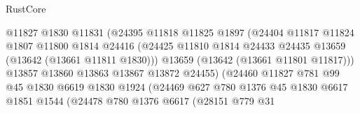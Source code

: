 \begin{lexlean}{RustCore}
\begin{coremodule}
                                      @11827
                                      @1830
                                      @11831
                                      (@24395
                                        @11818
                                        @11825
                                        @1897
                                        (@24404
                                          @11817
                                          @11824
                                          @1807
                                          @11800
                                          @1814
                                          @24416
                                          (@24425
                                            @11810
                                            @1814
                                            @24433
                                            @24435
                                            @13659
                                            (@13642 (@13661 @11811 @1830)))
                                          @13659
                                          (@13642 (@13661 @11801 @11817)))
                                        @13857
                                        @13860
                                        @13863
                                        @13867
                                        @13872
                                        @24455)
                                      (@24460
                                        @11827
                                        @781
                                        @99
                                        @45
                                        @1830
                                        @6619
                                        @1830
                                        @1924
                                        (@24469
                                          @627
                                          @780
                                          @1376
                                          @45
                                          @1830
                                          @6617
                                          @1851
                                          @1544
                                          (@24478
                                            @780
                                            @1376
                                            @6617
                                            (@28151
                                              @779
                                              @31

\end{coremodule}
\end{lexlean}
